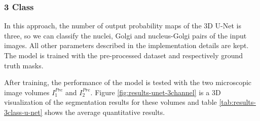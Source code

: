 \subsubsection*{3 Class}

In this approach, the number of output probability maps of the 3D U-Net is three, so we can classify the nuclei, Golgi and nucleus-Golgi pairs of the input images. All other parameters described in the implementation details are kept. The model is trained with the pre-processed dataset and respectively ground truth masks.

After training, the performance of the model is tested with the two microscopic image volumes $I^{Pre}_1$ and $I^{Pre}_2$. Figure \ref{fig:results-unet-3channel} is a 3D visualization of the segmentation results for these volumes and table \ref{tab:results-3class-u-net} shows the average quantitative results.

